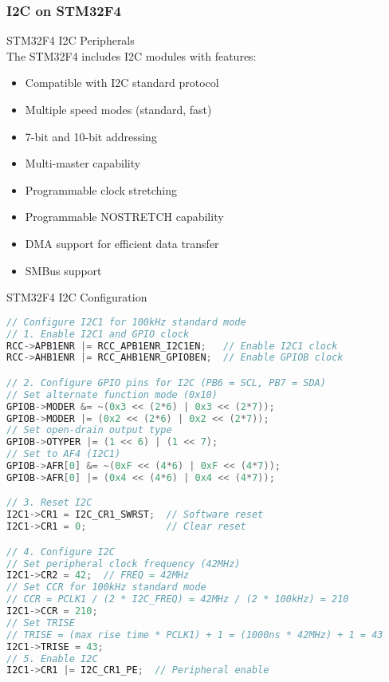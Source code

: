 \raggedcolumns
\pagebreak

\subsubsection{I2C on STM32F4}

\begin{concept}{STM32F4 I2C Peripherals}\\
The STM32F4 includes I2C modules with features:
\vspace{2mm}\\
\begin{minipage}{0.5\linewidth}
\begin{itemize}
    \item Compatible with I2C standard protocol
    \item Multiple speed modes (standard, fast)
    \item 7-bit and 10-bit addressing
    \item Multi-master capability
    \end{itemize}
\end{minipage}
\begin{minipage}{0.5\linewidth}
\begin{itemize}
    \item Programmable clock stretching
    \item Programmable NOSTRETCH capability
    \item DMA support for efficient data transfer
    \item SMBus support
\end{itemize}
\end{minipage}
\end{concept}

\begin{code}{STM32F4 I2C Configuration}
\begin{lstlisting}[language=C, style=basesmol]
// Configure I2C1 for 100kHz standard mode
// 1. Enable I2C1 and GPIO clock
RCC->APB1ENR |= RCC_APB1ENR_I2C1EN;   // Enable I2C1 clock
RCC->AHB1ENR |= RCC_AHB1ENR_GPIOBEN;  // Enable GPIOB clock

// 2. Configure GPIO pins for I2C (PB6 = SCL, PB7 = SDA)
// Set alternate function mode (0x10)
GPIOB->MODER &= ~(0x3 << (2*6) | 0x3 << (2*7));
GPIOB->MODER |= (0x2 << (2*6) | 0x2 << (2*7));
// Set open-drain output type
GPIOB->OTYPER |= (1 << 6) | (1 << 7);
// Set to AF4 (I2C1)
GPIOB->AFR[0] &= ~(0xF << (4*6) | 0xF << (4*7));
GPIOB->AFR[0] |= (0x4 << (4*6) | 0x4 << (4*7));

// 3. Reset I2C
I2C1->CR1 = I2C_CR1_SWRST;  // Software reset
I2C1->CR1 = 0;              // Clear reset

// 4. Configure I2C
// Set peripheral clock frequency (42MHz)
I2C1->CR2 = 42;  // FREQ = 42MHz
// Set CCR for 100kHz standard mode
// CCR = PCLK1 / (2 * I2C_FREQ) = 42MHz / (2 * 100kHz) = 210
I2C1->CCR = 210;
// Set TRISE
// TRISE = (max rise time * PCLK1) + 1 = (1000ns * 42MHz) + 1 = 43
I2C1->TRISE = 43;
// 5. Enable I2C
I2C1->CR1 |= I2C_CR1_PE;  // Peripheral enable
\end{lstlisting}
\end{code}

